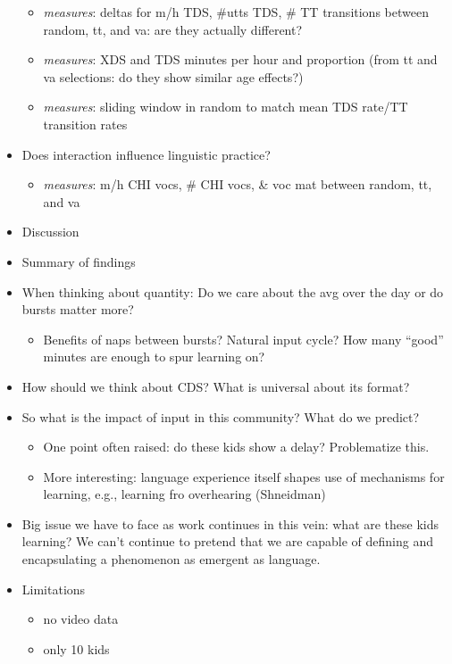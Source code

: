 \documentclass[man]{apa6}
\providecommand{\tightlist}{%
  \setlength{\itemsep}{0pt}\setlength{\parskip}{0pt}}
\theoremstyle{definition}
\theoremstyle{definition}
\theoremstyle{definition}
\theoremstyle{remark}
\begin{document}
\begin{itemize}
  \begin{itemize}
  \tightlist
  \item
    \emph{measures}: deltas for m/h TDS, \#utts TDS, \# TT transitions
    between random, tt, and va: are they actually different?
  \item
    \emph{measures}: XDS and TDS minutes per hour and proportion (from
    tt and va selections: do they show similar age effects?)
  \item
    \emph{measures}: sliding window in random to match mean TDS rate/TT
    transition rates
  \end{itemize}
\item
  Does interaction influence linguistic practice?

  \begin{itemize}
  \tightlist
  \item
    \emph{measures}: m/h CHI vocs, \# CHI vocs, \& voc mat between
    random, tt, and va
  \end{itemize}
\item
  Discussion
\item
  Summary of findings
\item
  When thinking about quantity: Do we care about the avg over the day or
  do bursts matter more?

  \begin{itemize}
  \tightlist
  \item
    Benefits of naps between bursts? Natural input cycle? How many
    \enquote{good} minutes are enough to spur learning on?
  \end{itemize}
\item
  How should we think about CDS? What is universal about its format?
\item
  So what is the impact of input in this community? What do we predict?

  \begin{itemize}
  \tightlist
  \item
    One point often raised: do these kids show a delay? Problematize
    this.
  \item
    More interesting: language experience itself shapes use of
    mechanisms for learning, e.g., learning fro overhearing (Shneidman)
  \end{itemize}
\item
  Big issue we have to face as work continues in this vein: what are
  these kids learning? We can't continue to pretend that we are capable
  of defining and encapsulating a phenomenon as emergent as language.
\item
  Limitations

  \begin{itemize}
  \tightlist
  \item
    no video data
  \item
    only 10 kids
  \end{itemize}
\end{itemize}
\end{document}
